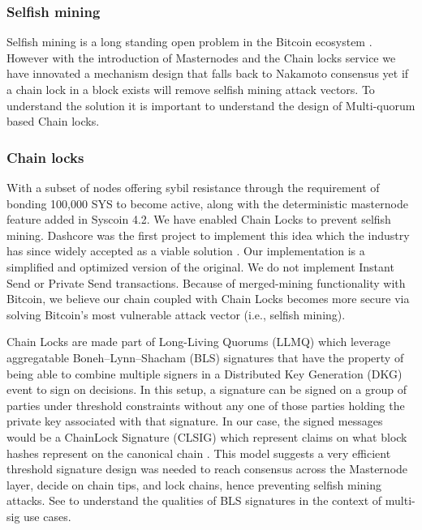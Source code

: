 \documentclass[peerreview]{ieeesyscoin}
\begin{document}
\subsubsection{Selfish mining}

Selfish mining is a long standing open problem in the Bitcoin ecosystem \cite{Eya18}. However with the introduction of Masternodes and the Chain locks service we have innovated a mechanism design that falls back to Nakamoto consensus yet if a chain lock in a block exists will remove selfish mining attack vectors. To understand the solution it is important to understand the design of Multi-quorum based Chain locks.

\subsubsection{Chain locks}

With a subset of nodes offering sybil resistance through the requirement of bonding 100,000 SYS to become active, along with the deterministic masternode feature added in Syscoin 4.2. We have enabled Chain Locks to prevent selfish mining. Dashcore was the first project to implement this idea \cite{Blo18} which the industry has since widely accepted as a viable solution \cite{Val19}. Our implementation is a simplified and optimized version of the original. We do not implement Instant Send or Private Send transactions. Because of merged-mining functionality with Bitcoin, we believe our chain coupled with Chain Locks becomes more secure via solving Bitcoin’s most vulnerable attack vector (i.e., selfish mining). 

Chain Locks are made part of Long-Living Quorums (LLMQ) which leverage aggregatable Boneh–Lynn–Shacham (BLS) signatures that have the property of being able to combine multiple signers in a Distributed Key Generation (DKG) event to sign on decisions. In this setup, a signature can be signed on a group of parties under threshold constraints without any one of those parties holding the private key associated with that signature. In our case, the signed messages would be a ChainLock Signature (CLSIG) which represent claims on what block hashes represent on the canonical chain \cite{Blo18}. This model suggests a very efficient   threshold signature design was needed to reach consensus across the Masternode layer, decide on chain tips, and lock chains, hence preventing selfish mining attacks. See \cite{Bon18} to understand the qualities of BLS signatures in the context of multi-sig use cases.
\end{document}
